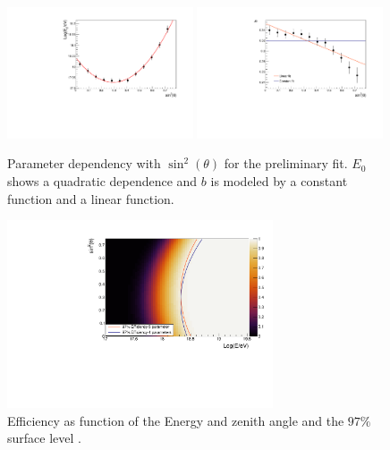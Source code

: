 \documentclass[12pt,a4paper]{article}
\begin{document}
\begin{figure}[h]
    \begin{center}
        \includegraphics[width=0.49\textwidth]{plots/E0.pdf}
        \includegraphics[width=0.49\textwidth]{plots/b.pdf}
        \caption{Parameter dependency with $\sin^2(\theta)$ for the preliminary fit. $E_0$ shows a quadratic dependence and $b$ is modeled by a constant function and a linear function.
        \label{fig:parameters}}
    \end{center}
\end{figure} 



\begin{figure}[h]
    \begin{center}
        \includegraphics[width=0.7\textwidth]{plots/Surface.pdf}
        \caption{Efficiency as function of the Energy and zenith angle and the $97\%$ surface level .
        \label{fig:surface}}
    \end{center}
\end{figure}  
\end{document}
